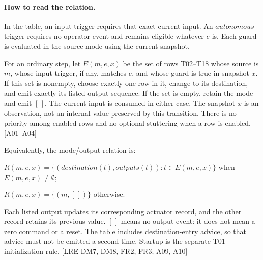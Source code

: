 \documentclass[10pt,a4paper]{article}
\begin{document}
\paragraph{How to read the relation.} In the table, an input trigger requires that exact current input. An $\mathit{autonomous}$ trigger requires no operator event and remains eligible whatever $\mathit{e}$ is. Each guard is evaluated in the source mode using the current snapshot.

For an ordinary step, let $\mathit{E}(\mathit{m},\mathit{e},\mathit{x})$ be the set of rows T02--T18 whose source is $\mathit{m}$, whose input trigger, if any, matches $\mathit{e}$, and whose guard is true in snapshot $\mathit{x}$. If this set is nonempty, choose exactly one row in it, change to its destination, and emit exactly its listed output sequence. If the set is empty, retain the mode and emit $[\,]$. The current input is consumed in either case. The snapshot $\mathit{x}$ is an observation, not an internal value preserved by this transition. There is no priority among enabled rows and no optional stuttering when a row is enabled. [A01--A04]

Equivalently, the mode/output relation is:

$\mathit{R}(\mathit{m},\mathit{e},\mathit{x}) = \{(\mathit{destination}(\mathit{t}), \mathit{outputs}(\mathit{t})) : \mathit{t} \in  \mathit{E}(\mathit{m},\mathit{e},\mathit{x})\}$ when $\mathit{E}(\mathit{m},\mathit{e},\mathit{x}) \ne  \emptyset $;

$\mathit{R}(\mathit{m},\mathit{e},\mathit{x}) = \{(\mathit{m}, [\,])\}$ otherwise.

Each listed output updates its corresponding actuator record, and the other record retains its previous value. $[\,]$ means no output event: it does not mean a zero command or a reset. The table includes destination-entry advice, so that advice must not be emitted a second time. Startup is the separate T01 initialization rule. [LRE-DM7, DM8, FR2, FR3; A09, A10]
\end{document}

